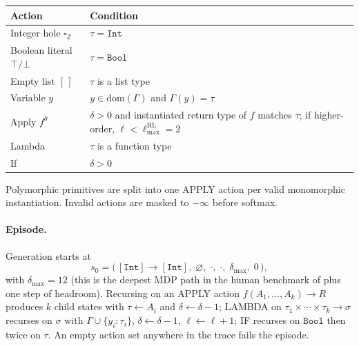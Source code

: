 \documentclass[12pt]{article}
\begin{document}
\begin{center}
\footnotesize
\begin{tabular}{ll}
\toprule
Action & Condition \\
\midrule
Integer hole $\square_{\mathbb{Z}}$ & $\tau = \texttt{Int}$ \\
Boolean literal $\top / \bot$       & $\tau = \texttt{Bool}$ \\
Empty list $[\,]$                   & $\tau$ is a list type \\
Variable $y$                        & $y \in \mathrm{dom}(\Gamma)$ and $\Gamma(y) = \tau$ \\
Apply $f^{\theta}$                  & $\delta > 0$ and instantiated return type of $f$ matches $\tau$;
                                      if higher-order, $\ell < \ell_{\max}^{\mathrm{RL}} = 2$ \\
Lambda                              & $\tau$ is a function type \\
If                                  & $\delta > 0$ \\
\bottomrule
\end{tabular}
\end{center}

Polymorphic primitives are split into one APPLY action per valid monomorphic instantiation. Invalid actions are masked to $-\infty$ before softmax.

\paragraph{Episode.} Generation starts at
\[
  s_0 = \bigl(\, [\texttt{Int}] \to [\texttt{Int}],\; \varnothing,\; \cdot,\; \cdot,\; \delta_{\max},\; 0 \,\bigr),
\]
with $\delta_{\max} = 12$ (this is the deepest MDP path in the human benchmark of \citet{rule2024symbolic} plus one step of headroom). Recursing on an APPLY action $f(A_1, \ldots, A_k) \to R$ produces $k$ child states with $\tau \leftarrow A_i$ and $\delta \leftarrow \delta - 1$; LAMBDA on $\tau_1 \times \cdots \times \tau_k \to \sigma$ recurses on $\sigma$ with $\Gamma \cup \{y_i : \tau_i\}$, $\delta \leftarrow \delta - 1$, $\ell \leftarrow \ell + 1$; IF recurses on $\texttt{Bool}$ then twice on $\tau$. An empty action set anywhere in the trace fails the episode.
\end{document}
